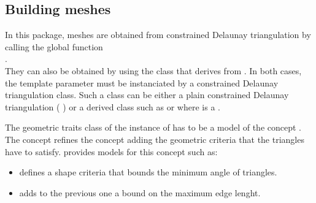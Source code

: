 {%




\subsection{Building meshes}
\label{sec:Mesh_2_building_meshes}

In this package, meshes are  obtained from
constrained Delaunay triangulation by calling the global function \\
. \\
They can also be obtained by using the class
 that derives from . 
In both cases,
the template parameter  must be instanciated by a
constrained Delaunay triangulation class.
Such a class 
can be either  a plain constrained Delaunay triangulation
( ) or
a derived class such as 
  or 
where  is a
.

The geometric traits class of the instance of  
has to be a model of the concept .
The concept  refines the concept
adding 
the geometric criteria that the triangles have to satisfy. 
\cgal provides models for this  concept such as:
\begin{itemize}
\item {} defines a shape criteria that
  bounds the minimum angle of triangles.
\item {} adds to the previous one a
  bound on the maximum edge lenght.
\end{itemize}

}
